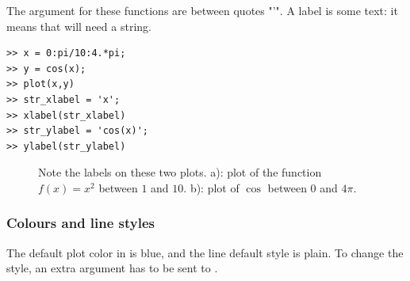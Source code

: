 		The argument for these functions are between quotes "'".
		A label is some text: it means that \matlab will need a string.
\begin{lstlisting}
>> x = 0:pi/10:4.*pi;
>> y = cos(x);
>> plot(x,y)
>> str_xlabel = 'x';
>> xlabel(str_xlabel)
>> str_ylabel = 'cos(x)';
>> ylabel(str_ylabel)
\end{lstlisting}
		\begin{figure}
			\center
			\caption{
				Note the labels on these two plots.
				a): plot of the function $f(x) = x^2$ between $1$ and $10$.
				b): plot of $\cos$ between $0$ and $4\pi$.
				}
			\label{fig-labels}
		\end{figure}	
		\subsubsection{Colours and line styles}
			The default plot color in \matlab is blue, and the line default style is plain.
			To change the style, an extra argument has to be sent to \matlab.
			
